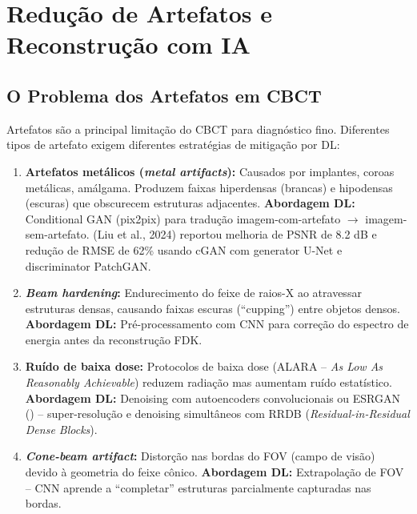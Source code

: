 \section{Redução de Artefatos e Reconstrução com IA}
\label{sec:artefatos-dl}

\subsection{O Problema dos Artefatos em CBCT}

Artefatos são a principal limitação do CBCT para diagnóstico fino. Diferentes
tipos de artefato exigem diferentes estratégias de mitigação por DL:

\begin{enumerate}
  \item \textbf{Artefatos metálicos (\textit{metal artifacts}):} Causados por
        implantes, coroas metálicas, amálgama. Produzem faixas hiperdensas
        (brancas) e hipodensas (escuras) que obscurecem estruturas adjacentes.
        \textbf{Abordagem DL:} Conditional GAN (pix2pix) para tradução
        imagem-com-artefato $\to$ imagem-sem-artefato. 
        (Liu et al., 2024) reportou melhoria de PSNR de 8.2 dB e redução de
        RMSE de 62\% usando cGAN com generator U-Net e discriminator PatchGAN.

  \item \textbf{\textit{Beam hardening}:} Endurecimento do feixe de raios-X ao
        atravessar estruturas densas, causando faixas escuras (``cupping'')
        entre objetos densos. \textbf{Abordagem DL:} Pré-processamento com CNN
        para correção do espectro de energia antes da reconstrução FDK.

  \item \textbf{Ruído de baixa dose:} Protocolos de baixa dose (ALARA --
        \textit{As Low As Reasonably Achievable}) reduzem radiação mas aumentam
        ruído estatístico. \textbf{Abordagem DL:} Denoising com autoencoders
        convolucionais ou ESRGAN () -- super-resolução
        e denoising simultâneos com RRDB (\textit{Residual-in-Residual Dense
        Blocks}).

  \item \textbf{\textit{Cone-beam artifact}:} Distorção nas bordas do FOV
        (campo de visão) devido à geometria do feixe cônico. \textbf{Abordagem
        DL:} Extrapolação de FOV -- CNN aprende a ``completar'' estruturas
        parcialmente capturadas nas bordas.
\end{enumerate}

